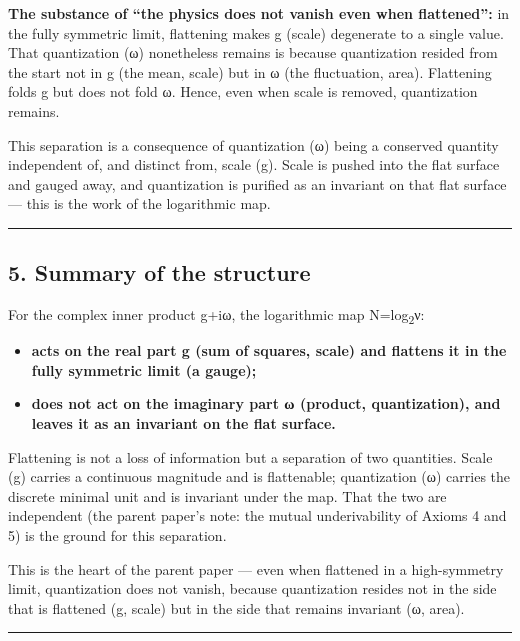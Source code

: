 \documentclass[11pt]{ltjsarticle}
\providecommand{\tightlist}{\setlength{\itemsep}{0pt}\setlength{\parskip}{0pt}}
\newcounter{none}
\begin{document}
\textbf{The substance of ``the physics does not vanish even when
flattened'':} in the fully symmetric limit, flattening makes g (scale)
degenerate to a single value. That quantization (ω) nonetheless remains
is because quantization resided from the start not in g (the mean,
scale) but in ω (the fluctuation, area). Flattening folds g but does not
fold ω. Hence, even when scale is removed, quantization remains.

This separation is a consequence of quantization (ω) being a conserved
quantity independent of, and distinct from, scale (g). Scale is pushed
into the flat surface and gauged away, and quantization is purified as
an invariant on that flat surface --- this is the work of the
logarithmic map.

\begin{center}\rule{0.5\linewidth}{0.5pt}\end{center}

\subsection{5. Summary of the structure}\label{summary-of-the-structure}

For the complex inner product g+iω, the logarithmic map N=log\textsubscript{2}ν:

\begin{itemize}
\tightlist
\item
  \textbf{acts on the real part g (sum of squares, scale) and flattens
  it in the fully symmetric limit (a gauge);}
\item
  \textbf{does not act on the imaginary part ω (product, quantization),
  and leaves it as an invariant on the flat surface.}
\end{itemize}

Flattening is not a loss of information but a separation of two
quantities. Scale (g) carries a continuous magnitude and is flattenable;
quantization (ω) carries the discrete minimal unit and is invariant
under the map. That the two are independent (the parent paper's note:
the mutual underivability of Axioms 4 and 5) is the ground for this
separation.

This is the heart of the parent paper --- even when flattened in a
high-symmetry limit, quantization does not vanish, because quantization
resides not in the side that is flattened (g, scale) but in the side
that remains invariant (ω, area).

\begin{center}\rule{0.5\linewidth}{0.5pt}\end{center}
\end{document}

